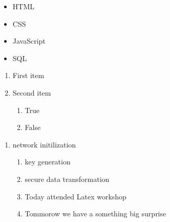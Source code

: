 \documentclass[12pt]{report}
\begin{document}
\begin{itemize}
    \item HTML 
    \item CSS 
    \item JavaScript
    \item SQL
\end{itemize}

\begin{enumerate}[label=\arabic*.]
    \item First item
    \item Second item
   \begin{enumerate}[label=(\alph*)]
    \item True
    \item False
    \end{enumerate}
\end{enumerate}
   \begin{enumerate}[label*=\arabic*]
    \item network initilization
      \begin{enumerate}[label*=.\arabic*)]
        \item key generation
        \item secure data transformation
        \item [\ding{118}] Today attended Latex workshop
        \item [\ding{228}] Tommorow we have a something big  surprise 
    \end{enumerate}
\end{enumerate}
\end{document}
